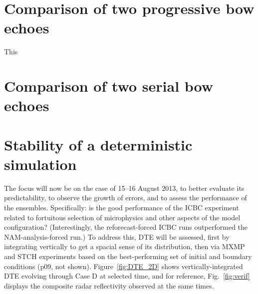 \documentclass{ametsoc}
\begin{document}
\section{Comparison of two progressive bow echoes}\label{sec:prog}

This

\section{Comparison of two serial bow echoes}\label{sec:serial}

\section{Stability of a deterministic simulation}
The focus will now be on the case of 15--16 August 2013, to better evaluate its predictability, to observe the growth of errors, and to assess the performance of the ensembles. Specifically: is the good performance of the ICBC experiment related to fortuitous selection of microphysics and other aspects of the model configuration? (Interestingly, the reforecast-forced ICBC runs outperformed the NAM-analysis-forced run.) To address this, DTE will be assessed, first by integrating vertically to get a spacial sense of its distribution, then via MXMP and STCH experiments based on the best-performing set of initial and boundary conditions (p09, not shown). Figure~\ref{fig:DTE_2D} shows vertically-integrated DTE evolving through Case D at selected time, and for reference, Fig.~\ref{fig:verif} displays the composite radar reflectivity observed at the same times. 
\end{document}
